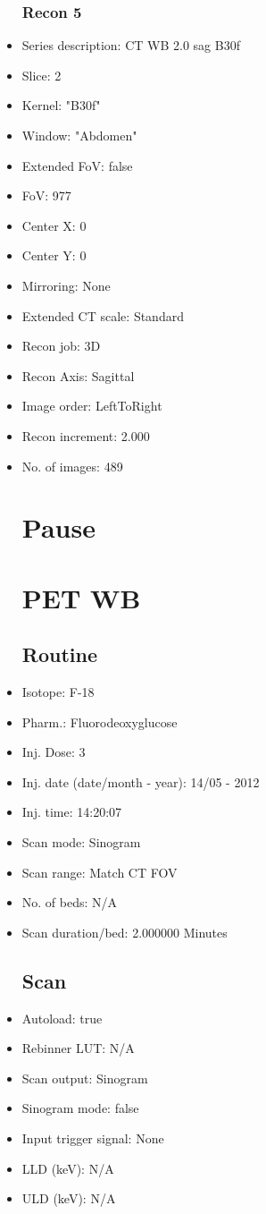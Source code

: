 \documentclass[12pt]{article}
\begin{document}
\begin{itemize}
\subsubsection{Recon 5}
\item Series description: CT WB 2.0 sag B30f
\item Slice: 2
\item Kernel: "B30f"
\item Window: "Abdomen"
\item Extended FoV: false
\item FoV: 977
\item Center X: 0
\item Center Y: 0
\item Mirroring: None
\item Extended CT scale: Standard
\item Recon job: 3D
\item Recon Axis: Sagittal
\item Image order: LeftToRight
\item Recon increment: 2.000
\item No. of images: 489
\section{Pause}

\section{PET WB}
\subsection{Routine}
\item Isotope: F-18
\item Pharm.: Fluorodeoxyglucose
\item Inj. Dose: 3 
\item Inj. date (date/month - year): 14/05 - 2012
\item Inj. time: 14:20:07
\item Scan mode: Sinogram
\item Scan range: Match CT FOV
\item No. of beds: N/A
\item Scan duration/bed: 2.000000 Minutes
\subsection{Scan}
\item Autoload: true
\item Rebinner LUT: N/A
\item Scan output: Sinogram
\item Sinogram mode: false
\item Input trigger signal: None
\item LLD (keV): N/A
\item ULD (keV): N/A

\end{itemize}
\end{document}
